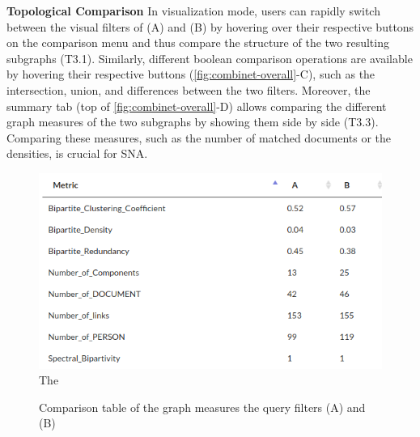 \noindent\textbf{Topological Comparison}
In visualization mode,
users can rapidly switch between the visual filters of (A) and (B) by hovering over their respective buttons on the comparison menu and thus compare the structure of the two resulting subgraphs (T3.1).
Similarly, different boolean comparison operations are available by hovering their respective buttons (\autoref{fig:combinet-overall}-C), such as the intersection, union, and differences between the two filters. %
Moreover, the summary tab (top of \autoref{fig:combinet-overall}-D) allows comparing the different graph measures of the two subgraphs by showing them side by side (T3.3).
Comparing these measures, such as the number of matched documents or the densities, is crucial for SNA.

\begin{figure}[h]
    \centering
    \includegraphics[width=0.8\linewidth]{static/figures/ComBiNet/OriginalPaperFigures/comparisonPlots/graphMeasuresComparison.png}
  The  \caption{Comparison table of the graph measures the query filters (A) and (B)}\label{fig:combinet-comparisonTable}
\end{figure}




